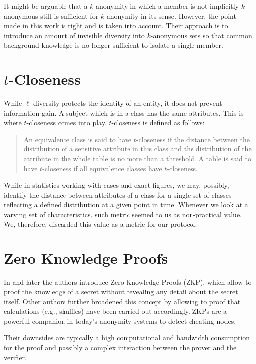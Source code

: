 It might be arguable that a $k$-anonymity in which a member is not implicitly $k$-anonymous still is sufficient for $k$-anonymity in its sense. However, the point made in this work is right and is taken into account. Their approach is to introduce an amount of invisible diversity into $k$-anonymous sets so that common background knowledge is no longer sufficient to isolate a single member.

\section{\texorpdfstring{$t$}{t}-Closeness}
While $\ell$-diversity protects the identity of an entity, it does not prevent information gain. A subject which is in a class has the same attributes. This is where $t$-closeness\cite{li2007t} comes into play. $t$-closeness is defined as follows:

\begin{quote}
	An equivalence class is said to have $t$-closeness if the distance between the distribution of a sensitive attribute in this class and the distribution of the attribute in the whole table is no more than a threshold. A table is said to have $t$-closeness if all equivalence classes have $t$-closeness.
\end{quote}

While in statistics working with cases and exact figures, we may, possibly, identify the distance between attributes of a class for a single set of classes reflecting a defined distribution at a given point in time. Whenever we look at a varying set of characteristics, such metric seemed to us as non-practical value. We, therefore, discarded this value as a metric for our protocol.

\section{Zero Knowledge Proofs}
In \cite{goldwasser1989knowledge} and later \cite{de1987non} the authors introduce Zero-Knowledge Proofs (ZKP), which allow to proof the knowledge of a secret without revealing any detail about the secret itself. Other authors further broadened this concept by allowing to proof that calculations (e.g., shuffles) have been carried out accordingly. ZKPs are a powerful companion in today's anonymity systems to detect cheating nodes.

Their downsides are typically a high computational and bandwidth consumption for the proof and possibly a complex interaction between the prover and the verifier.

